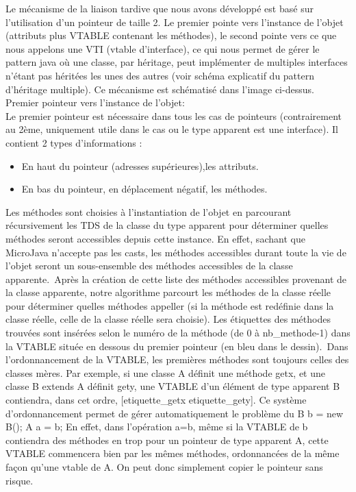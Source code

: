 
Le mécanisme de la liaison tardive que nous avons développé est basé sur l'utilisation
d'un pointeur de taille 2. Le premier pointe vers l'instance de l'objet (attributs
plus VTABLE contenant les méthodes), le second pointe vers ce que nous appelons
une VTI (vtable d'interface), ce qui nous permet de gérer le pattern java où une
classe, par héritage, peut implémenter de multiples interfaces n'étant pas
héritées les unes des autres (voir schéma explicatif du pattern d'héritage
multiple). Ce mécanisme est schématisé dans l'image ci-dessus.\\

Premier pointeur vers l'instance de l'objet:\\
Le premier pointeur est nécessaire dans tous les cas de pointeurs (contrairement
au 2ème, uniquement utile dans le cas ou le type apparent est une interface). Il
contient 2 types d'informations :

\begin{itemize}
	\item En haut du pointeur (adresses supérieures),les attributs.
	\item En bas du pointeur, en déplacement négatif, les méthodes.

\end{itemize}

Les méthodes sont choisies à l'instantiation de l'objet en parcourant récursivement
les TDS de la classe du type apparent pour déterminer quelles méthodes seront
accessibles depuis cette instance. En effet, sachant que MicroJava n'accepte pas
les casts, les méthodes accessibles durant toute la vie de l'objet seront un
sous-ensemble des méthodes accessibles de la classe apparente.\
Après la création de cette liste des méthodes accessibles provenant de la classe apparente, notre
algorithme parcourt les méthodes de la classe réelle pour déterminer quelles
méthodes appeller (si la méthode est redéfinie dans la classe réelle, celle de
la classe réelle sera choisie). Les étiquettes des méthodes trouvées sont
insérées selon le numéro de la méthode (de 0 à nb\_methode-1) dans la VTABLE
située en dessous du premier pointeur (en bleu dans le dessin).\
Dans l'ordonnancement de la VTABLE, les premières méthodes sont toujours celles
des classes mères. Par exemple, si une classe A définit une méthode getx, et une
classe B extends A définit gety, une VTABLE d'un élément de type apparent B
contiendra, dans cet ordre, [etiquette\_getx etiquette\_gety]. Ce système
d'ordonnancement permet de gérer automatiquement le problème du B b = new B(); A
a = b; En effet, dans l'opération a=b, même si la VTABLE de b contiendra des 
méthodes en trop pour un pointeur de type apparent A, cette
VTABLE commencera bien par les mêmes méthodes, ordonnancées de la même façon
qu'une vtable de A. On peut donc simplement copier le pointeur sans risque.\\

